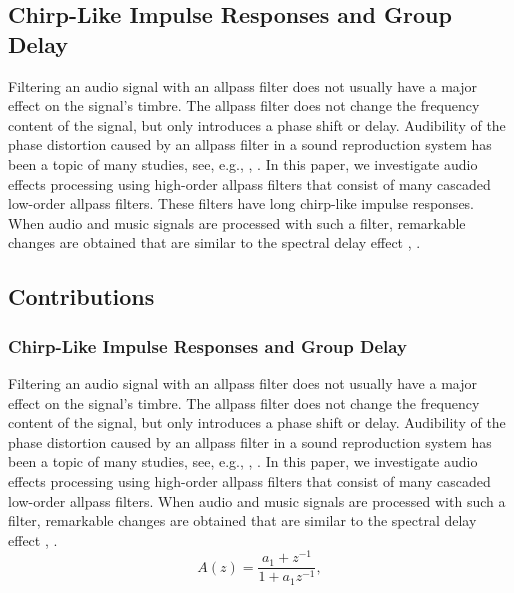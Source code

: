 \documentclass{aes2e}
\begin{document}
\subsection{Chirp-Like Impulse Responses and Group Delay}
Filtering an audio signal with an allpass filter does not usually have a major effect on the signal's timbre. The allpass filter does not change the frequency content of the signal, but only introduces a phase shift or delay. Audibility of the phase distortion caused by an allpass filter in a sound reproduction system has been a topic of many studies, see, e.g., \cite{DEK1}, \cite{DEK2}. In this paper, we investigate audio effects processing using high-order allpass filters that consist of many cascaded low-order allpass filters. These filters have long chirp-like impulse responses. When audio and music signals are processed with such a filter, remarkable changes are obtained that are similar to the spectral delay effect  \cite{DEK3}, \cite{DEK4}.

\subsection{Contributions}
\subsubsection{Chirp-Like Impulse Responses and Group Delay}
Filtering an audio signal with an allpass filter does not usually have a major effect on the signal's timbre. The allpass filter does not change the frequency content of the signal, but only introduces a phase shift or delay. Audibility of the phase distortion caused by an allpass filter in a sound reproduction system has been a topic of many studies, see, e.g., \cite{DEK1}, \cite{DEK2}. In this paper, we investigate audio effects processing using high-order allpass filters that consist of many cascaded low-order allpass filters.  When audio and music signals are processed with such a filter, remarkable changes are obtained that are similar to the spectral delay effect  \cite{DEK3}, \cite{DEK4}.
\begin{equation}
A(z) = \frac{{a_1  + z^{ - 1} }}{{1 + a_1 z^{ - 1} }},
\end{equation}
\end{document}
